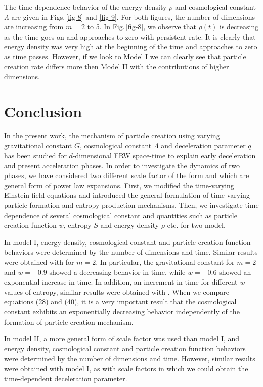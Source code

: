 \documentclass[superscriptaddress,showpacs,pre,twocolumn]{revtex4-1}
\begin{document}
The time dependence behavior of the energy density $\rho$ and cosmological constant $\Lambda$ are given in Figs.\,\ref{fig-8} and \ref{fig-9}. For both figures, the number of dimensions  are increasing from $m = 2$ to 5. 
In Fig.\,\ref{fig-8}, we observe that $\rho(t)$ is decreasing as the time goes on and approaches to zero with persistent rate. It is clearly that energy density was very high at the beginning of the time and approaches to zero as time passes. However, if we look to Model I we can clearly see that particle creation rate differs more then Model II with the contributions of higher dimensions. 


\section{Conclusion}

In the present work, the mechanism of particle creation using varying gravitational constant $G$, cosmological constant $\Lambda$ and deceleration parameter $q$ has been studied for $d$-dimensional FRW space-time to explain early deceleration and present acceleration phases. In order to investigate the dynamics of two phases, we have considered two different scale factor of the form  and  which are general form of power law expansions. First, we modified the time-varying Einstein field equations and introduced the general formulation of time-varying particle formation and entropy production mechanisms. Then,  we investigate time dependence of several cosmological constant and quantities such as particle creation function $\psi$, entropy $S$ and energy density $\rho$ etc. for two model.

In model I, energy density, cosmological constant and particle creation function behaviors were determined by the number of dimensions and time. Similar results were obtained with \cite{Singh2012,Chand2016,Amirhashchi2014} for $m = 2$. In particular, the gravitational constant for $m = 2$ and $w = -0.9$ showed a decreasing behavior in time, while $w = -0.6$ showed an exponential increase in time. In addition, an increment in time for different $w$ values of entropy, similar results were obtained with \cite{xKay2004}. When we compare equations (28) and (40), it is a very important result that the cosmological constant exhibits an exponentially decreasing behavior independently of the formation of particle creation mechanism.

In model II, a more general form of scale factor was used than model I, and energy density, cosmological constant and particle creation function behaviors were determined by the number of dimensions and time.  However, similar results were obtained with model I, as with scale factors in which we could obtain the time-dependent deceleration parameter. 
\end{document}
